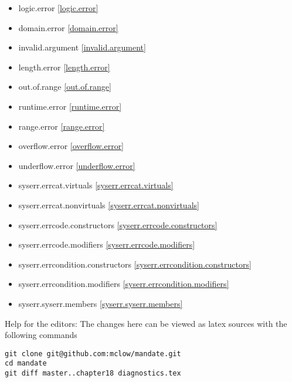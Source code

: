 \begin{itemize}
\item{logic.error                       \ref{logic.error}}
\item{domain.error                      \ref{domain.error}}
\item{invalid.argument                  \ref{invalid.argument}}
\item{length.error                      \ref{length.error}}
\item{out.of.range                      \ref{out.of.range}}
\item{runtime.error                     \ref{runtime.error}}
\item{range.error                       \ref{range.error}}
\item{overflow.error                    \ref{overflow.error}}
\item{underflow.error                   \ref{underflow.error}}
\item{syserr.errcat.virtuals            \ref{syserr.errcat.virtuals}}
\item{syserr.errcat.nonvirtuals         \ref{syserr.errcat.nonvirtuals}}
\item{syserr.errcode.constructors       \ref{syserr.errcode.constructors}}
\item{syserr.errcode.modifiers          \ref{syserr.errcode.modifiers}}
\item{syserr.errcondition.constructors  \ref{syserr.errcondition.constructors}}
\item{syserr.errcondition.modifiers     \ref{syserr.errcondition.modifiers}}
\item{syserr.syserr.members             \ref{syserr.syserr.members}}
\end{itemize}

\vfill
Help for the editors: The changes here can be viewed as latex sources with the following commands
\begin{verbatim}
git clone git@github.com:mclow/mandate.git
cd mandate
git diff master..chapter18 diagnostics.tex
\end{verbatim}
\newpage
